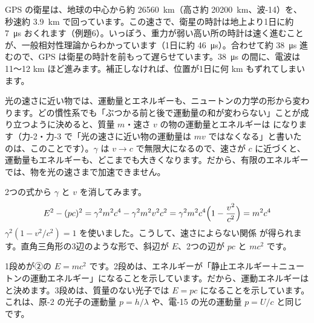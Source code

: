 \begin{phmijika}
GPS の衛星は、地球の中心から約 \qty{26560}{km}（高さ約 \qty{20200}{km}、波-14）を、秒速約 \qty{3.9}{km} で回っています。この速さで、衛星の時計は地上より1日に約 \qty{7}{\micro s} おくれます（例題6）。いっぽう、重力が弱い高い所の時計は速く進むことが、一般相対性理論からわかっています（1日に約 \qty{46}{\micro s}）。合わせて約 \qty{38}{\micro s} 進むので、GPS は衛星の時計を前もって遅らせています。\qty{38}{\micro s} の間に、電波は 11〜12 km ほど進みます。補正しなければ、位置が1日に何 km もずれてしまいます。
\end{phmijika}

\label{ph:原-11:sec8}
光の速さに近い物では、運動量とエネルギーも、ニュートンの力学の形から変わります。どの慣性系でも「ぶつかる前と後で運動量の和が変わらない」ことが成り立つように決めると、質量 $m$・速さ $v$ の物の運動量とエネルギーは
\label{ph:原-11:pE}になります（力-2・力-3 で「光の速さに近い物の運動量は $mv$ ではなくなる」と書いたのは、このことです）。$\gamma$ は $v\to c$ で無限大になるので、速さが $c$ に近づくと、運動量もエネルギーも、どこまでも大きくなります。だから、有限のエネルギーでは、物を光の速さまで加速できません。

2つの式から $\gamma$ と $v$ を消してみます。
\[ E^2-(pc)^2=\gamma^2m^2c^4-\gamma^2m^2v^2c^2=\gamma^2m^2c^4\Bigl(1-\frac{v^2}{c^2}\Bigr)=m^2c^4 \]
$\gamma^2(1-v^2/c^2)=1$ を使いました。こうして、速さによらない関係
\label{ph:原-11:Ep}が得られます。直角三角形の3辺のような形で、斜辺が $E$、2つの辺が $pc$ と $mc^2$ です。

\begin{phflow}[$E^2=(pc)^2+(mc^2)^2$ から]
\end{phflow}
\label{ph:原-11:emc2}1段めが②の $E=mc^2$ です。2段めは、エネルギーが「静止エネルギー＋ニュートンの運動エネルギー」になることを示しています。だから、運動エネルギーは
と決めます。3段めは、質量のない光子では $E=pc$ になることを示しています。これは、原-2 の光子の運動量 $p=h/\lambda$ や、電-15 の光の運動量 $p=U/c$ と同じです。

